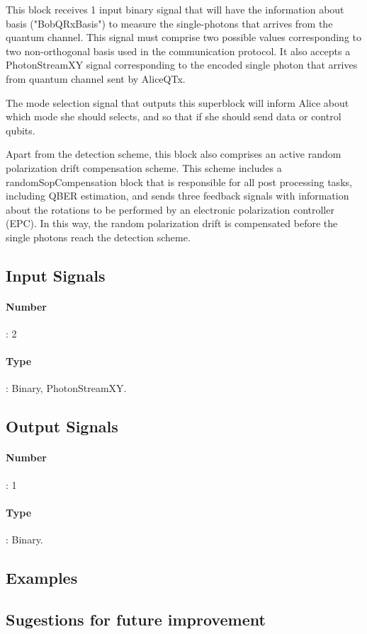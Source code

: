 This block receives 1 input binary signal that will have the information about basis ("BobQRxBasis") to measure the single-photons that arrives from the quantum channel. This signal must comprise two possible values corresponding to two non-orthogonal basis used in the communication protocol. It also accepts a PhotonStreamXY signal corresponding to the encoded single photon that arrives from quantum channel sent by AliceQTx.

The mode selection signal that outputs this superblock will inform Alice about which mode she should selects, and so that if she should send data or control qubits.

Apart from the detection scheme, this block also comprises an active random polarization drift compensation scheme. This scheme includes a randomSopCompensation block that is responsible for all post processing tasks, including QBER estimation, and sends three feedback signals with information about the rotations to be performed by an electronic polarization controller (EPC). In this way, the random polarization drift is compensated before the single photons reach the detection scheme.


\subsection*{Input Signals}
\paragraph*{Number}: 2
\paragraph*{Type}: Binary, PhotonStreamXY.

\subsection*{Output Signals}
\paragraph*{Number}: 1
\paragraph*{Type}: Binary.

\subsection*{Examples}


\subsection*{Sugestions for future improvement}



